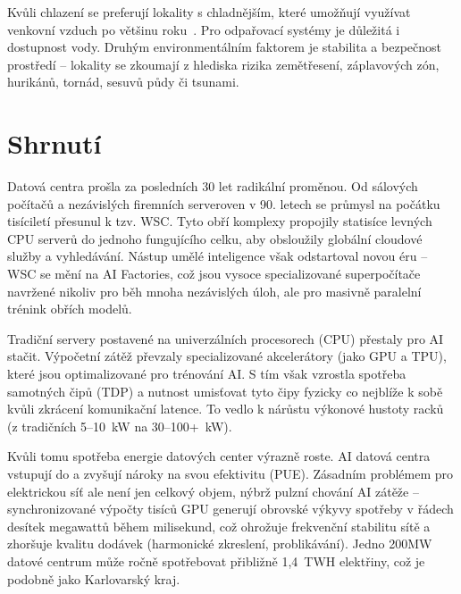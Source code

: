 Kvůli chlazení se preferují lokality s chladnějším, které umožňují využívat venkovní vzduch po většinu roku~\cite{barroso_data_2026, geng_data_2014}. Pro odpařovací systémy je důležitá i dostupnost vody. Druhým environmentálním faktorem je stabilita a bezpečnost prostředí -- lokality se zkoumají z hlediska rizika zemětřesení, záplavových zón, hurikánů, tornád, sesuvů půdy či tsunami.~\cite{tatnall_reflections_2012,geng_data_2014}

\newpage

\section{Shrnutí}
\label{sec:shrnuti}


Datová centra prošla za posledních 30 let radikální proměnou. Od sálových počítačů a nezávislých firemních serveroven v 90. letech se průmysl na počátku tisíciletí přesunul k tzv. WSC. Tyto obří komplexy propojily statisíce levných CPU serverů do jednoho fungujícího celku, aby obsloužily globální cloudové služby a vyhledávání. Nástup umělé inteligence však odstartoval novou éru -- WSC se mění na AI Factories, což jsou vysoce specializované superpočítače navržené nikoliv pro běh mnoha nezávislých úloh, ale pro masivně paralelní trénink obřích modelů.~\cite{barroso_data_2026,geng_data_2014,barroso_brief_2021}

Tradiční servery postavené na univerzálních procesorech (CPU) přestaly pro AI stačit. Výpočetní zátěž převzaly specializované akcelerátory (jako GPU a TPU), které jsou optimalizované pro trénování AI. S tím však vzrostla spotřeba samotných čipů (TDP) a nutnost umisťovat tyto čipy fyzicky co nejblíže k sobě kvůli zkrácení komunikační latence. To vedlo k nárůstu výkonové hustoty racků (z tradičních 5--10~kW na 30--100+~kW).~\cite{chen_electricity_2025, barroso_data_2026, sheng_power_2026}

Kvůli tomu spotřeba energie datových center výrazně roste. AI datová centra vstupují do  a zvyšují nároky na svou efektivitu (PUE). Zásadním problémem pro elektrickou síť ale není jen celkový objem, nýbrž pulzní chování AI zátěže -- synchronizované výpočty tisíců GPU generují obrovské výkyvy spotřeby v řádech desítek megawattů během milisekund, což ohrožuje frekvenční stabilitu sítě a zhoršuje kvalitu dodávek (harmonické zkreslení, problikávání). Jedno 200MW datové centrum může ročně spotřebovat přibližně 1,4~TWH elektřiny, což je podobně jako Karlovarský kraj.~\cite{chen_electricity_2025, sheng_power_2026, energeticky_regulacni_urad_spotreba_2024}

